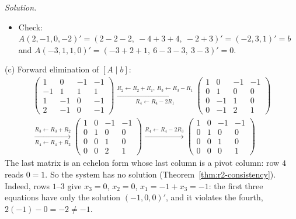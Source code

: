 \documentclass[12pt]{article}
\theoremstyle{definition}
\newenvironment{solution}{\par\noindent\textit{Solution.}\ }{\par\smallskip}
\begin{document}
\begin{solution}
\begin{itemize}
\[\]
\item Check: \(A(2,-1,0,-2)'=(2-2-2,\ -4+3+4,\ -2+3)'=(-2,3,1)'=b\) and
\(A(-3,1,1,0)'=(-3+2+1,\ 6-3-3,\ 3-3)'=0\).
\end{itemize}
(c) Forward elimination of \([A\mid b]\):
\[
\begin{gathered}
\left(\begin{array}{ccc|c}1&0&-1&-1\\-1&1&1&1\\1&-1&0&-1\\2&-1&0&-1\end{array}\right)
\xrightarrow[R_4\leftarrow R_4-2R_1]{R_2\leftarrow R_2+R_1,\ R_3\leftarrow R_3-R_1}
\left(\begin{array}{ccc|c}1&0&-1&-1\\0&1&0&0\\0&-1&1&0\\0&-1&2&1\end{array}\right)
\\
\xrightarrow[R_4\leftarrow R_4+R_2]{R_3\leftarrow R_3+R_2}
\left(\begin{array}{ccc|c}1&0&-1&-1\\0&1&0&0\\0&0&1&0\\0&0&2&1\end{array}\right)
\xrightarrow{R_4\leftarrow R_4-2R_3}
\left(\begin{array}{ccc|c}1&0&-1&-1\\0&1&0&0\\0&0&1&0\\0&0&0&1\end{array}\right)
\end{gathered}
\]
The last matrix is an echelon form whose last column is a pivot column: row \(4\) reads \(0=1\). So the system has
no solution (Theorem~\ref{thm:r2-consistency}). Indeed, rows \(1\)--\(3\) give \(x_3=0\), \(x_2=0\),
\(x_1=-1+x_3=-1\): the first three equations have only the solution \((-1,0,0)'\), and it violates the fourth,
\(2(-1)-0=-2\ne-1\).
\end{solution}
\end{document}
